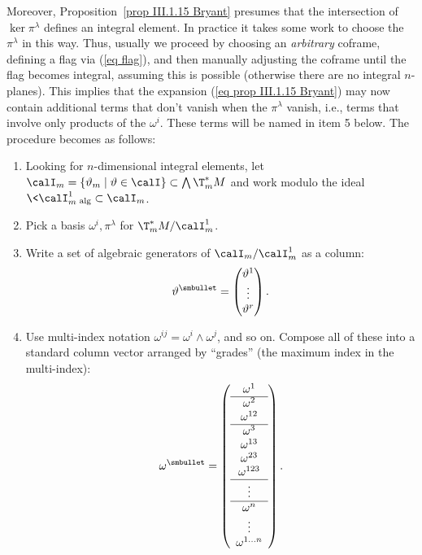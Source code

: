 Moreover, Proposition~\ref{prop III.1.15 Bryant} presumes that the intersection of $\ker\pi^\lambda$ defines an integral element. In practice it takes some work to choose the $\pi^\lambda$ in this way. Thus, usually we proceed by choosing an \emph{arbitrary} coframe, defining a flag via (\ref{eq flag}), and then manually adjusting the coframe until the flag becomes integral, assuming this is possible (otherwise there are no integral $n$-planes). This implies that the expansion (\ref{eq prop III.1.15 Bryant}) may now contain additional terms that don't vanish when the $\pi^\lambda$ vanish, i.e., terms that involve only products of the $\omega^i$. These terms will be named in item 5 below. The procedure becomes as follows:
\begin{enumerate}
    \item Looking for $n$-dimensional integral elements, let $\calI_m=\{\vartheta_m\mid\vartheta\in\calI\}\subset \bigwedge\T^\ast_m M$ and work modulo the ideal $\<\calI^1_m\>_{\mathrm{alg}}\subset \calI_m$.
    \item Pick a basis $\omega^i,\pi^\lambda$ for $\T^\ast_m M\slash\calI^1_m$.
    \item Write a set of algebraic generators of $\calI_m\slash\calI^1_m$ as a column:
    \[\vartheta^{\smbullet}=\begin{pmatrix}
        \vartheta^1\\\vdots \\ \vartheta^r
    \end{pmatrix}.\]
    \item Use multi-index notation $\omega^{ij}=\omega^i\wedge\omega^j$, and so on. Compose all of these into a standard column vector arranged by ``grades'' (the maximum index in the multi-index):
    \[
        \omega^{\smbullet}=\left(\begin{array}{c}
        \omega^1\\ \hline 
        \omega^2 \\
        \omega^{12}\\ \hline 
        \omega^3\\
        \omega^{13}\\
        \omega^{23}\\
        \omega^{123}\\\hline 
        \vdots \\\hline 
        \omega^n \\
        \vdots \\
        \omega^{1\ldots n}
    \end{array}\right).
\]
\end{enumerate}
